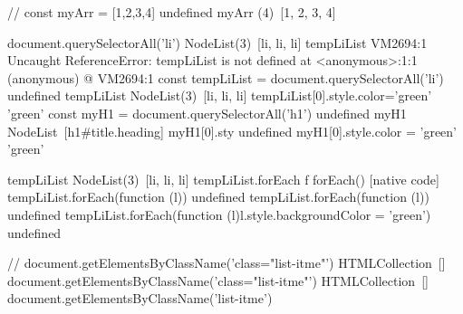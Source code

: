 //
const myArr = [1,2,3,4]
undefined
myArr
(4) [1, 2, 3, 4]

document.querySelectorAll('li')
NodeList(3) [li, li, li]
tempLiList
VM2694:1 Uncaught ReferenceError: tempLiList is not defined
    at <anonymous>:1:1
(anonymous) @ VM2694:1
const tempLiList = document.querySelectorAll('li')
undefined
tempLiList
NodeList(3) [li, li, li]
tempLiList[0].style.color='green'
'green'
const myH1 = document.querySelectorAll('h1')
undefined
myH1
NodeList [h1#title.heading]
myH1[0].sty
undefined
myH1[0].style.color = 'green'
'green'

tempLiList
NodeList(3) [li, li, li]
tempLiList.forEach
ƒ forEach() { [native code] }
tempLiList.forEach(function (l){})
undefined
tempLiList.forEach(function (l){})
undefined
tempLiList.forEach(function (l){l.style.backgroundColor = 'green'})
undefined

//
document.getElementsByClassName('class="list-itme"')
HTMLCollection []
document.getElementsByClassName('class="list-itme"')
HTMLCollection []
document.getElementsByClassName('list-itme')